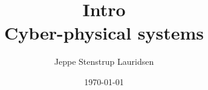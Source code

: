 \documentclass[12pt]{article}
\title{%
  Intro \\
  \large Cyber-physical systems}
\author{Jeppe Stenstrup Lauridsen}
\date{\today}
\begin{document}
\begin{titlepage}
\clearpage\maketitle
\thispagestyle{empty}
\end{titlepage}



\end{document}
